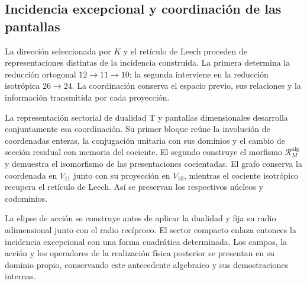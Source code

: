 \subsection{Incidencia excepcional y coordinación de las pantallas}
\label{exc:pantallas-dualidad}

La dirección seleccionada por \(K\) y el retículo de Leech proceden
de representaciones distintas de la incidencia construida. La primera
determina la reducción ortogonal \(12\to11\to10\); la segunda
interviene en la reducción isotrópica \(26\to24\). La coordinación
conserva el espacio previo, sus relaciones y la información transmitida
por cada proyección.

La representación sectorial de dualidad T y pantallas dimensionales desarrolla
conjuntamente esa coordinación. Su primer bloque reúne la involución de
coordenadas enteras, la conjugación unitaria con sus dominios y el
cambio de sección residual con memoria del cociente. El segundo
construye el morfismo \(\mathcal R_M^{\mathrm{alg}}\) y demuestra el
isomorfismo de las presentaciones cocientadas.
El grafo conserva la coordenada en \(V_{11}\) junto con su proyección
en \(V_{10}\), mientras el cociente isotrópico recupera el retículo
de Leech. Así se preservan los respectivos núcleos y codominios.

La elipse de acción se construye antes de aplicar la dualidad y fija
su radio adimensional junto con el radio recíproco. El sector compacto enlaza entonces
la incidencia excepcional con una forma cuadrática determinada. Los
campos, la acción y los operadores de la realización física posterior
se presentan en su dominio propio, conservando este antecedente
algebraico y sus demostraciones internas.
